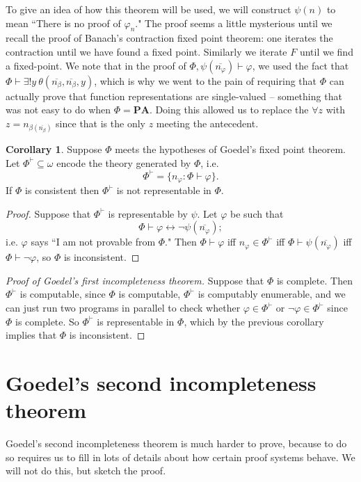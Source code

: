 \documentclass[12pt]{report}
\renewcommand{\iff}{\leftrightarrow}
\newcommand{\PA}{\mathbf{PA}}
\newcommand{\proves}{\vdash}
\theoremstyle{definition}
\newtheorem{corollary}[theorem]{Corollary}
\begin{document}
To give an idea of how this theorem will be used, we will construct $\psi(n)$ to mean ``There is no proof of $\varphi_n$."
The proof seems a little mysterious until we recall the proof of Banach's contraction fixed point theorem: one iterates the contraction until we have found a fixed point. Similarly we iterate $F$ until we find a fixed-point.
We note that in the proof of $\Phi, \psi(\overline{n_\varphi}) \proves \varphi$, we used the fact that $\Phi \proves \exists!y~\theta(\overline{n_\beta}, \overline{n_\beta}, y)$, which is why we went to the pain of requiring that $\Phi$ can actually prove that function representations are single-valued -- something that was not easy to do when $\Phi = \PA$.
Doing this allowed us to replace the $\forall z$ with $z = n_{\beta(\overline{n_\beta})}$ since that is the only $z$ meeting the antecedent.

\begin{corollary}
Suppose $\Phi$ meets the hypotheses of Goedel's fixed point theorem. Let $\Phi^\proves \subseteq \omega$ encode the theory generated by $\Phi$, i.e.
$$\Phi^\proves = \{n_\varphi: \Phi \proves \varphi\}.$$
If $\Phi$ is consistent then $\Phi^\proves$ is not representable in $\Phi$.
\end{corollary}
\begin{proof}
Suppose that $\Phi^\proves$ is representable by $\psi$. Let $\varphi$ be such that
$$\Phi \proves \varphi \iff \neg \psi(\overline{n_\varphi});$$
i.e. $\varphi$ says ``I am not provable from $\Phi$."
Then $\Phi \proves \varphi$ iff $n_\varphi \in \Phi^\proves$ iff $\Phi \proves \psi(\overline{n_\varphi})$ iff $\Phi \proves \neg \varphi$, so $\Phi$ is inconsistent.
\end{proof}
\begin{proof}[Proof of Goedel's first incompleteness theorem]
Suppose that $\Phi$ is complete. Then $\Phi^\proves$ is computable, since $\Phi$ is computable, $\Phi^\proves$ is computably enumerable, and we can just run two programs in parallel to check whether $\varphi \in \Phi^\proves$ or $\neg\varphi \in \Phi^\proves$ since $\Phi$ is complete.
So $\Phi^\proves$ is representable in $\Phi$, which by the previous corollary implies that $\Phi$ is inconsistent.
\end{proof}

\section{Goedel's second incompleteness theorem}
Goedel's second incompleteness theorem is much harder to prove, because to do so requires us to fill in lots of details about how certain proof systems behave. We will not do this, but sketch the proof.
\end{document}
